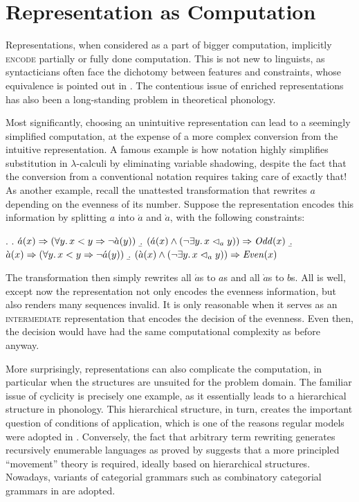 \documentclass[12pt, a4paper]{report}
\newcommand{\textemph}[1]{\textsc{#1}}
\newcommand{\textterm}[1]{\textsc{#1}\index{#1}}
\renewcommand{\implies}{\Rightarrow}
\begin{document}
\section{Representation as Computation}
Representations, when considered as a part of bigger computation,
implicitly \textterm{encode} partially or fully done computation.
This is not new to linguists, as syntacticians often face the
dichotomy between features and constraints, whose equivalence is
pointed out in \textcite{g17cgdfc}.  The contentious issue of enriched
representations has also been a long-standing problem in theoretical
phonology.

Most significantly, choosing an unintuitive representation can lead to
a seemingly simplified computation, at the expense of a more complex
conversion from the intuitive representation.  A famous example is how
 notation highly simplifies substitution in
\(\lambda\)-calculi by eliminating variable shadowing, despite the
fact that the conversion from a conventional notation requires taking
care of exactly that!  As another example, recall the unattested
transformation that rewrites \(a\) depending on the evenness of its
number.  Suppose the representation encodes this information by
splitting \(a\) into \(\acute{a}\) and \(\grave{a}\), with the
following constraints:

\ex.
\a. \(\acute{a}(x) \implies (\forall y\ldotp x < y \implies
\neg\grave{a}(y))\)
\b. \((\acute{a}(x) \land
(\neg\exists y\ldotp x \vartriangleleft_{a} y))
\implies \mathit{Odd}(x)\)
\b. \(\grave{a}(x) \implies (\forall y\ldotp x < y \implies
\neg\acute{a}(y))\)
\b. \((\grave{a}(x) \land
(\neg\exists y\ldotp x \vartriangleleft_{a} y))
\implies \mathit{Even}(x)\)

The transformation then simply rewrites all \(\acute{a}\)s to \(a\)s
and all \(\grave{a}\)s to \(b\)s.  All is well, except now the
representation not only encodes the evenness information, but also
renders many sequences invalid.  It is only reasonable when it serves
as an \textemph{intermediate} representation that encodes the decision
of the evenness.  Even then, the decision would have had the same
computational complexity as before anyway.

More surprisingly, representations can also complicate the
computation, in particular when the structures are unsuited for the
problem domain.  The familiar issue of cyclicity is precisely one
example, as it essentially leads to a hierarchical structure in
phonology.  This hierarchical structure, in turn, creates the
important question of conditions of application, which is one of the
reasons regular models were adopted in \textcite{kk94rmprs}.
Conversely, the fact that arbitrary term rewriting generates
recursively enumerable languages as proved by \textcite{pr73gptg}
suggests that a more principled \enquote{movement} theory is required,
ideally based on hierarchical structures.  Nowadays, variants of
categorial grammars such as combinatory categorial grammars in
\textcite{s00sp} are adopted.
\end{document}
